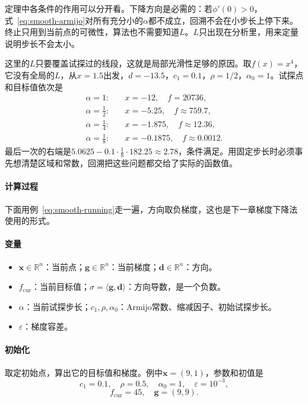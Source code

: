 定理中各条件的作用可以分开看。下降方向是必需的：若$\phi'(0)>0$，式~\eqref{eq:smooth-armijo}对所有充分小的$\alpha$都不成立，回溯不会在小步长上停下来。终止只用到当前点的可微性，算法也不需要知道$L$。$L$只出现在分析里，用来定量说明步长不会太小。

这里的$L$只要覆盖试探过的线段，这就是局部光滑性足够的原因。取$f(x)=x^4$，它没有全局的$L$，从$x=1.5$出发，$d=-13.5$，$c_1=0.1$，$\rho=1/2$，$\alpha_0=1$。试探点和目标值依次是
\[
 \begin{aligned}
 \alpha=1:&\quad x=-12,\quad f=20736,\\
 \alpha=\tfrac12:&\quad x=-5.25,\quad f\approx759.7,\\
 \alpha=\tfrac14:&\quad x=-1.875,\quad f\approx12.36,\\
 \alpha=\tfrac18:&\quad x=-0.1875,\quad f\approx0.0012.
 \end{aligned}
\]
最后一次的右端是$5.0625-0.1\cdot\frac18\cdot182.25\approx2.78$，条件满足。用固定步长时必须事先想清楚区域和常数，回溯把这些问题都交给了实际的函数值。

\paragraph{计算过程}
下面用例~\eqref{eq:smooth-running}走一遍，方向取负梯度，这也是下一章梯度下降法使用的形式。

\paragraph{变量}
\begin{itemize}
 \item $\bm{x}\in\mathbb{R}^n$：当前点；$\bm{g}\in\mathbb{R}^n$：当前梯度；$\bm{d}\in\mathbb{R}^n$：方向。
 \item $f_{\mathrm{cur}}$：当前目标值；$\sigma=\langle\bm{g},\bm{d}\rangle$：方向导数，是一个负数。
 \item $\alpha$：当前试探步长；$c_1,\rho,\alpha_0$：Armijo常数、缩减因子、初始试探步长。
 \item $\varepsilon$：梯度容差。
\end{itemize}

\paragraph{初始化}
取定初始点，算出它的目标值和梯度。例中$\bm{x}=(9,1)$，参数和初值是
\[
 c_1=0.1,\quad\rho=0.5,\quad\alpha_0=1,\quad\varepsilon=10^{-3},
\]
\[
 f_{\mathrm{cur}}=45,\quad\bm{g}=(9,9).
\]

